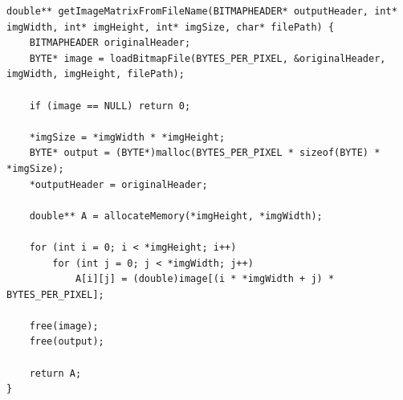 \begin{verbatim}
double** getImageMatrixFromFileName(BITMAPHEADER* outputHeader, int* imgWidth, int* imgHeight, int* imgSize, char* filePath) {
    BITMAPHEADER originalHeader;
    BYTE* image = loadBitmapFile(BYTES_PER_PIXEL, &originalHeader, imgWidth, imgHeight, filePath);

    if (image == NULL) return 0;

    *imgSize = *imgWidth * *imgHeight;
    BYTE* output = (BYTE*)malloc(BYTES_PER_PIXEL * sizeof(BYTE) * *imgSize);
    *outputHeader = originalHeader;

    double** A = allocateMemory(*imgHeight, *imgWidth);

    for (int i = 0; i < *imgHeight; i++)
        for (int j = 0; j < *imgWidth; j++)
            A[i][j] = (double)image[(i * *imgWidth + j) * BYTES_PER_PIXEL];

    free(image);
    free(output);

    return A;
}   
\end{verbatim}
\newpage
